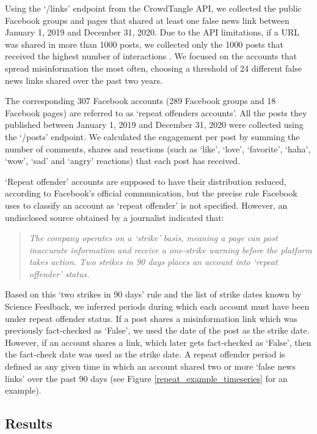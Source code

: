 \documentclass[review]{elsarticle}
\begin{document}
Using the `/links' endpoint from the CrowdTangle API, we collected the public Facebook groups and pages that shared at least one false news link between January 1, 2019 and December 31, 2020. 
Due to the API limitations, if a URL was shared in more than 1000 posts, we collected only the 1000 posts that received the highest number of interactions \cite{docCT}. 
We focused on the accounts that spread misinformation the most often, choosing a threshold of 24 different false news links shared over the past two years.  

The corresponding 307 Facebook accounts (289 Facebook groups and 18 Facebook pages) are referred to as `repeat offenders accounts'. 
All the posts they published between January 1, 2019 and December 31, 2020 were collected using the `/posts' endpoint. 
We calculated the engagement per post by summing the number of comments, shares and reactions (such as ‘like’, ‘love’, ‘favorite’, ‘haha’, ‘wow’, ‘sad’ and ‘angry’ reactions) that each post has received.

`Repeat offender' accounts are supposed to have their distribution reduced, according to Facebook's official communication, but the precise rule Facebook uses to classify an account as `repeat offender' is not specified. 
However, an undisclosed source obtained by a journalist \cite{2strikes90daysRule} indicated that:
\begin{quote}
\emph{The company operates on a `strike' basis, meaning a page can post inaccurate information and receive a one-strike warning before the platform takes action. 
Two strikes in 90 days places an account into `repeat offender' status.}
\end{quote}


Based on this `two strikes in 90 days' rule and the list of strike dates known by Science Feedback, we inferred periods during which each account must have been under repeat offender status. 
If a post shares a misinformation link which was previously fact-checked as `False', we used the date of the post as the strike date. 
However, if an account shares a link, which later gets fact-checked as `False', then the fact-check date was used as the strike date. 
A repeat offender period is defined as any given time in which an account shared two or more `false news links' over the past 90 days (see Figure \ref{repeat_example_timeseries} for an example).

\subsection{Results}
\end{document}
